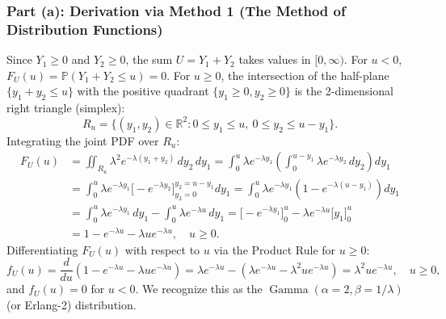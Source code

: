 \documentclass[11pt, letterpaper]{article}
\theoremstyle{definition}
\theoremstyle{remark}
\newcommand{\R}{\mathbb{R}}
\newcommand{\Prob}{\mathbb{P}}
\begin{document}
\subsubsection*{Part (a): Derivation via Method 1 (The Method of Distribution Functions)}
Since $Y_1 \ge 0$ and $Y_2 \ge 0$, the sum $U = Y_1 + Y_2$ takes values in $[0, \infty)$. For $u < 0$, $F_U(u) = \Prob(Y_1 + Y_2 \le u) = 0$. For $u \ge 0$, the intersection of the half-plane $\{y_1 + y_2 \le u\}$ with the positive quadrant $\{y_1 \ge 0, y_2 \ge 0\}$ is the 2-dimensional right triangle (simplex):
\[
    R_u = \{(y_1, y_2) \in \R^2 : 0 \le y_1 \le u, \ 0 \le y_2 \le u - y_1\}.
\]
Integrating the joint PDF over $R_u$:
\begin{align*}
    F_U(u) &= \iint_{R_u} \lambda^2 e^{-\lambda(y_1 + y_2)} \, dy_2 \, dy_1 = \int_0^u \lambda e^{-\lambda y_1} \left( \int_0^{u - y_1} \lambda e^{-\lambda y_2} \, dy_2 \right) dy_1 \\
    &= \int_0^u \lambda e^{-\lambda y_1} \Big[-e^{-\lambda y_2}\Big]_{y_2=0}^{y_2=u - y_1} dy_1 = \int_0^u \lambda e^{-\lambda y_1} \left(1 - e^{-\lambda(u - y_1)}\right) dy_1 \\
    &= \int_0^u \lambda e^{-\lambda y_1} \, dy_1 - \int_0^u \lambda e^{-\lambda u} \, dy_1 = \Big[-e^{-\lambda y_1}\Big]_0^u - \lambda e^{-\lambda u} \Big[y_1\Big]_0^u \\
    &= 1 - e^{-\lambda u} - \lambda u e^{-\lambda u}, \quad u \ge 0.
\end{align*}
Differentiating $F_U(u)$ with respect to $u$ via the Product Rule for $u \ge 0$:
\[
    f_U(u) = \frac{d}{du}\left(1 - e^{-\lambda u} - \lambda u e^{-\lambda u}\right) = \lambda e^{-\lambda u} - \left(\lambda e^{-\lambda u} - \lambda^2 u e^{-\lambda u}\right) = \lambda^2 u e^{-\lambda u}, \quad u \ge 0,
\]
and $f_U(u) = 0$ for $u < 0$. We recognize this as the $\operatorname{Gamma}(\alpha = 2, \beta = 1/\lambda)$ (or Erlang-2) distribution.
\end{document}
